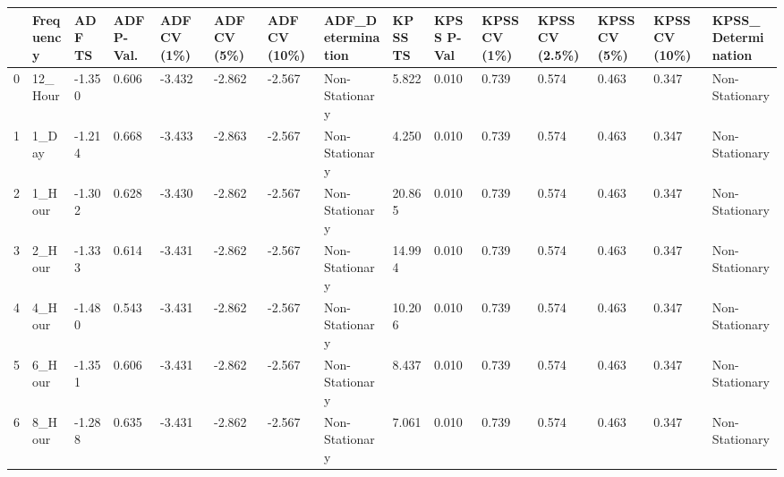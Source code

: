 \begin{tabular}{lllllllllllllll}
\toprule
 & Frequency & ADF TS & ADF P-Val. & ADF CV (1\%) & ADF CV (5\%) & ADF CV (10\%) & ADF_Determination & KPSS TS & KPSS P-Val & KPSS CV (1\%) & KPSS CV (2.5\%) & KPSS CV (5\%) & KPSS CV (10\%) & KPSS_Determination \\
\midrule
0 & 12_Hour & -1.350 & 0.606 & -3.432 & -2.862 & -2.567 & Non-Stationary & 5.822 & 0.010 & 0.739 & 0.574 & 0.463 & 0.347 & Non-Stationary \\
1 & 1_Day & -1.214 & 0.668 & -3.433 & -2.863 & -2.567 & Non-Stationary & 4.250 & 0.010 & 0.739 & 0.574 & 0.463 & 0.347 & Non-Stationary \\
2 & 1_Hour & -1.302 & 0.628 & -3.430 & -2.862 & -2.567 & Non-Stationary & 20.865 & 0.010 & 0.739 & 0.574 & 0.463 & 0.347 & Non-Stationary \\
3 & 2_Hour & -1.333 & 0.614 & -3.431 & -2.862 & -2.567 & Non-Stationary & 14.994 & 0.010 & 0.739 & 0.574 & 0.463 & 0.347 & Non-Stationary \\
4 & 4_Hour & -1.480 & 0.543 & -3.431 & -2.862 & -2.567 & Non-Stationary & 10.206 & 0.010 & 0.739 & 0.574 & 0.463 & 0.347 & Non-Stationary \\
5 & 6_Hour & -1.351 & 0.606 & -3.431 & -2.862 & -2.567 & Non-Stationary & 8.437 & 0.010 & 0.739 & 0.574 & 0.463 & 0.347 & Non-Stationary \\
6 & 8_Hour & -1.288 & 0.635 & -3.431 & -2.862 & -2.567 & Non-Stationary & 7.061 & 0.010 & 0.739 & 0.574 & 0.463 & 0.347 & Non-Stationary \\
\bottomrule
\end{tabular}
